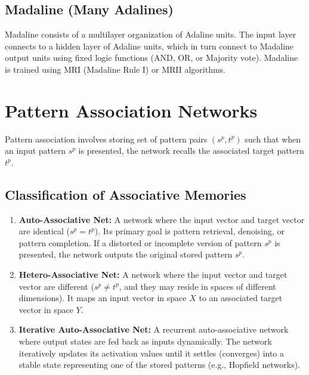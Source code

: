 \documentclass[12pt,a4paper]{article}
\begin{document}
\subsection{Madaline (Many Adalines)}
Madaline consists of a multilayer organization of Adaline units. The input layer connects to a hidden layer of Adaline units, which in turn connect to Madaline output units using fixed logic functions (AND, OR, or Majority vote). Madaline is trained using MRI (Madaline Rule I) or MRII algorithms.

\section{Pattern Association Networks}

Pattern association involves storing set of pattern pairs $(s^p, t^p)$ such that when an input pattern $s^p$ is presented, the network recalls the associated target pattern $t^p$.

\subsection{Classification of Associative Memories}
\begin{enumerate}[leftmargin=*, itemsep=3.5pt]
  \item \textbf{Auto-Associative Net:}
    A network where the input vector and target vector are identical ($s^p = t^p$). Its primary goal is pattern retrieval, denoising, or pattern completion. If a distorted or incomplete version of pattern $s^p$ is presented, the network outputs the original stored pattern $s^p$.
  \item \textbf{Hetero-Associative Net:}
    A network where the input vector and target vector are different ($s^p \neq t^p$, and they may reside in spaces of different dimensions). It maps an input vector in space $X$ to an associated target vector in space $Y$.
  \item \textbf{Iterative Auto-Associative Net:}
    A recurrent auto-associative network where output states are fed back as inputs dynamically. The network iteratively updates its activation values until it settles (converges) into a stable state representing one of the stored patterns (e.g., Hopfield networks).
\end{enumerate}
\end{document}
